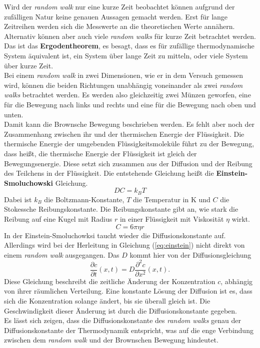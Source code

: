Wird der \emph{random walk} nur eine kurze Zeit beobachtet können aufgrund der zufälligen Natur keine genauen Aussagen gemacht werden. Erst für lange Zeitreihen werden sich die Messwerte an die theoretischen Werte annähern. Alternativ können aber auch viele \emph{random walks} für kurze Zeit betrachtet werden. Das ist das \textbf{Ergodentheorem}, es besagt, dass es für zufällige thermodynamische System äquivalent ist, ein System über lange Zeit zu mitteln, oder viele System über kurze Zeit.\\
Bei einem \emph{random walk} in zwei Dimensionen, wie er in dem Versuch gemessen wird, können die beiden Richtungen unabhängig voneinander als zwei \emph{random walks} betrachtet werden. Es werden also gleichzeitig zwei Münzen geworfen, eine für die Bewegung nach links und rechts und eine für die Bewegung nach oben und unten.\\


Damit kann die Brownsche Bewegung beschrieben werden. Es fehlt aber noch der Zusammenhang zwischen ihr und der thermischen Energie der Flüssigkeit. Die thermische Energie der umgebenden Flüssigkeitsmoleküle führt zu der Bewegung, dass heißt, die thermische Energie der Flüssigkeit ist gleich der Bewegungsenergie. Diese setzt sich zusammen aus der Diffusion und der Reibung des Teilchens in der Flüssigkeit. Die entstehende Gleichung heißt die  \textbf{Einstein-Smoluchowski} Gleichung.
\begin{equation}
  D C = k_B T \label{eq:einstein}
\end{equation}
Dabei ist $k_B$ die Boltzmann-Konstante, $T$ die Temperatur in K und $C$ die Stokessche Reibungskonstante. Die Reibungskonstante gibt an, wie stark die Reibung auf eine Kugel mit Radius $r$ in einer Flüssigkeit mit Viskosität $\eta$ wirkt.
\begin{equation}
  C = 6 \pi \eta r
\end{equation}
In der Einstein-Smoluchowksi taucht wieder die Diffusionskonstante auf. Allerdings wird bei der Herleitung in Gleichung (\ref{eq:einstein}) nicht direkt von einem \emph{random walk} ausgegangen. Das $D$ kommt hier von der Diffusionsgleichung
\begin{equation}
  \frac{\partial c}{\partial t}(x, t) = D \frac{\partial^2 c}{\partial x^2} (x, t). \label{eq:diffusion}
\end{equation}
Diese Gleichung beschreibt die zeitliche Änderung der Konzentration $c$, abhängig von ihrer räumlichen Verteilung. Eine konstante Lösung der Diffusion ist es, dass sich die Konzentration solange ändert, bis sie überall gleich ist. Die Geschwindigkeit dieser Änderung ist durch die Diffusionskonstante gegeben.\\
Es lässt sich zeigen, dass die Diffusionskonstante des \emph{random walks} genau der Diffusionskonstante der Thermodynamik entspricht, was auf die enge Verbindung zwischen dem \emph{random walk} und der Brownschen Bewegung hindeutet.
